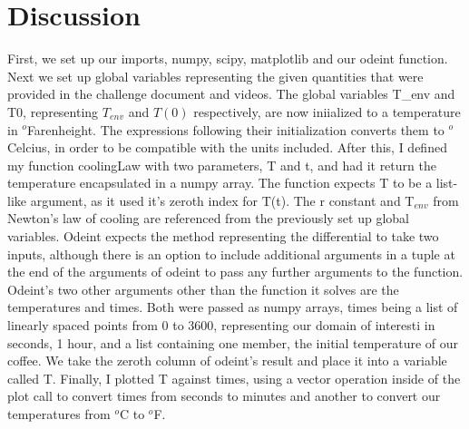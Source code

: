 \documentclass[12pt]{article}
\begin{document}
\section{Discussion}
First, we set up our imports, numpy, scipy, matplotlib and our odeint function. Next we set up global variables representing the given quantities that were provided in the challenge document and videos. The global variables T\_env and T0, representing $T_{env}$ and $T(0)$ respectively, are now iniialized to a temperature in $^o$Farenheight. The expressions following their initialization converts them to $^o$Celcius, in order to be compatible with the units included. After this, I defined my function coolingLaw with two parameters, T and t, and had it return the temperature encapsulated in a numpy array. The function expects T to be a list-like argument, as it used it's zeroth index for T(t). The r constant and T$_{env}$ from Newton's law of cooling are referenced from the previously set up global variables. Odeint expects the method representing the differential to take two inputs, although there is an option to include additional arguments in a tuple at the end of the arguments of odeint to pass any further arguments to the function. Odeint's two other arguments other than the function it solves are the temperatures and times. Both were passed as numpy arrays, times being a list of linearly spaced points from 0 to 3600, representing our domain of interesti in seconds, 1 hour, and a list containing one member, the initial temperature of our coffee. We take the zeroth column of odeint's result and place it into a variable called T. Finally, I plotted T against times, using a vector operation inside of the plot call to convert times from seconds to minutes and another to convert our temperatures from $^o$C to $^o$F.
\end{document}
